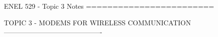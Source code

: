 ENEL 529 - Topic 3 Notes
========================

TOPIC 3 - MODEMS FOR WIRELESS COMMUNICATION
-------------------------------------------